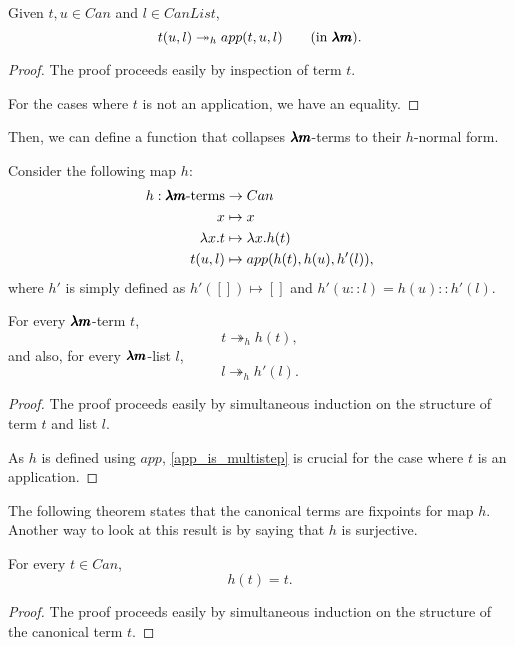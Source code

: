\begin{lemma}
  \label{app_is_multistep}
  Given $t, u \in Can$ and $l \in CanList$, 
  \[ t(u, l) \twoheadrightarrow_h app(t, u, l) \qquad \text{(in $\pmb{\lambda m}$)}. \]
\end{lemma}
\begin{proof}
  The proof proceeds easily by inspection of term $t$.

  For the cases where $t$ is not an application, we have an equality.
\end{proof}

Then, we can define a function that collapses $\pmb{\lambda m}$-terms to their $h$-normal form.

\begin{definition}
  Consider the following map $h$:
  \begin{align*}
    h : \pmb{\lambda m} \text{-terms} &\to Can \\
    x &\mapsto x \\
    \lambda x . t &\mapsto \lambda x . h(t) \\
    t(u,l) &\mapsto app(h(t), h(u), h'(l)),
  \end{align*}
  where $h'$ is simply defined as
  $h'([]) \mapsto []$ and $h'(u::l) = h(u)::h'(l)$.
\end{definition}

\begin{theorem}
  \label{h_is_multistep}
  For every $\pmb{\lambda m}$-term $t$,
  \[ t \twoheadrightarrow_h h(t), \]
  and also, for every $\pmb{\lambda m}$-list $l$,
  \[ l \twoheadrightarrow_h h'(l). \]
\end{theorem}
\begin{proof}
  The proof proceeds easily by simultaneous induction on the structure of term $t$ and list $l$.

  As $h$ is defined using $app$, \cref{app_is_multistep} is crucial for the case where $t$ is an application. 
\end{proof}

The following theorem states that the canonical terms are fixpoints for map $h$.
Another way to look at this result is by saying that $h$ is surjective.

\begin{theorem}[$h$ fixpoints]
  \label{h_fixpoints}
  For every $t \in Can$, \[ h(t) = t. \]
\end{theorem}
\begin{proof}
  The proof proceeds easily by simultaneous induction on the structure of the canonical term $t$.
\end{proof}

